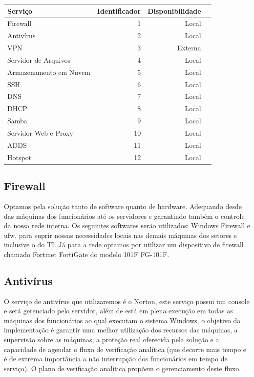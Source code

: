 \documentclass[12pt]{article}
\begin{document}
\begin{center}
\begin{tabular}{| l | r | r | r |}
\hline
Serviço & Identificador & Disponibilidade\\
\hline
Firewall & 1 & Local\\
Antivírus & 2 & Local\\
VPN & 3 & Externa\\
Servidor de Arquivos & 4 & Local\\
Armazenamento em Nuvem & 5 & Local\\
SSH & 6 & Local\\
DNS & 7 & Local\\
DHCP & 8 & Local\\
Samba & 9 & Local\\
Servidor Web e Proxy & 10 & Local\\
ADDS & 11 & Local\\
Hotspot & 12 & Local\\
\hline
\end{tabular}
\end{center}

\subsection{Firewall}
Optamos pela solução tanto de software quanto de hardware. Adequando desde das máquinas dos funcionários até os servidores e garantindo também o controle da nossa rede interna. Os seguintes softwares serão utilizados: Windows Firewall e ufw, para suprir nossas necessidades locais nas demais máquinas dos setores e inclusive o do TI. Já para a rede optamos por utilizar um dispositivo de firewall chamado Fortinet FortiGate do modelo 101F FG-101F.

\subsection{Antivírus}
O serviço de antivírus que utilizaremos é o Norton, este serviço possui um console e será gerenciado pelo servidor, além de está em plena execução em todas as máquinas dos funcionários ao qual executam o sistema Windows, o objetivo da implementação é garantir uma melhor utilização dos recursos das máquinas, a supervisão sobre as máquinas, a proteção real oferecida pela solução e a capacidade de agendar o fluxo de verificação analítica (que decorre mais tempo e é de extrema importância a não interrupção dos funcionários em tempo de serviço). O plano de verificação analítica propõem o gerenciamento deste fluxo.
\end{document}
